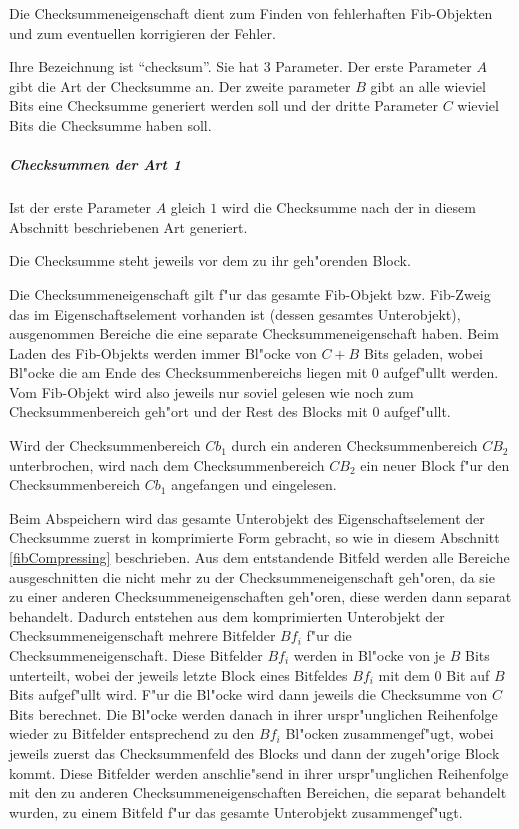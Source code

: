 Die Checksummeneigenschaft dient zum Finden von fehlerhaften Fib-Objekten und zum eventuellen korrigieren der Fehler.

Ihre Bezeichnung ist ``checksum''. Sie hat 3 Parameter. Der erste Parameter $A$ gibt die Art der Checksumme an. Der zweite parameter $B$ gibt an alle wieviel Bits eine Checksumme generiert werden soll und der dritte Parameter $C$ wieviel Bits die Checksumme haben soll.


\subparagraph{Checksummen der Art 1}

Ist der erste Parameter $A$ gleich $1$ wird die Checksumme nach der in diesem Abschnitt beschriebenen Art generiert.

Die Checksumme steht jeweils vor dem zu ihr geh"orenden Block.

Die Checksummeneigenschaft gilt f"ur das gesamte Fib-Objekt bzw. Fib-Zweig das im Eigenschaftselement vorhanden ist (dessen gesamtes Unterobjekt), ausgenommen Bereiche die eine separate Checksummeneigenschaft haben. Beim Laden des Fib-Objekts werden immer Bl"ocke von $C+B$ Bits geladen, wobei Bl"ocke die am Ende des Checksummenbereichs liegen mit $0$ aufgef"ullt werden. Vom Fib-Objekt wird also jeweils nur soviel gelesen wie noch zum Checksummenbereich geh"ort und der Rest des Blocks mit $0$ aufgef"ullt.

Wird der Checksummenbereich $Cb_1$ durch ein anderen Checksummenbereich $CB_2$ unterbrochen, wird nach dem Checksummenbereich $CB_2$ ein neuer Block f"ur den Checksummenbereich $Cb_1$ angefangen und eingelesen.

Beim Abspeichern wird das gesamte Unterobjekt des Eigenschaftselement der Checksumme zuerst in komprimierte Form gebracht, so wie in diesem Abschnitt \ref{fibCompressing} beschrieben. Aus dem entstandende Bitfeld werden alle Bereiche ausgeschnitten die nicht mehr zu der Checksummeneigenschaft geh"oren, da sie zu einer anderen Checksummeneigenschaften geh"oren, diese werden dann separat behandelt. Dadurch entstehen aus dem komprimierten Unterobjekt der Checksummeneigenschaft mehrere Bitfelder $Bf_i$ f"ur die Checksummeneigenschaft. Diese Bitfelder $Bf_i$ werden in Bl"ocke von je $B$ Bits unterteilt, wobei der jeweils letzte Block eines Bitfeldes $Bf_i$ mit dem 0 Bit auf $B$ Bits aufgef"ullt wird. F"ur die Bl"ocke wird dann jeweils die Checksumme von $C$ Bits berechnet. Die Bl"ocke werden danach in ihrer urspr"unglichen Reihenfolge wieder zu Bitfelder entsprechend zu den $Bf_i$ Bl"ocken zusammengef"ugt, wobei jeweils zuerst das Checksummenfeld des Blocks und dann der zugeh"orige Block kommt. Diese Bitfelder werden anschlie"send in ihrer urspr"unglichen Reihenfolge mit den zu anderen Checksummeneigenschaften Bereichen, die separat behandelt wurden, zu einem Bitfeld f"ur das gesamte Unterobjekt zusammengef"ugt.

